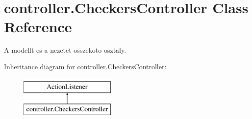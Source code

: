 \hypertarget{classcontroller_1_1_checkers_controller}{}\section{controller.\+Checkers\+Controller Class Reference}
\label{classcontroller_1_1_checkers_controller}


A modellt es a nezetet osszekoto osztaly.  


Inheritance diagram for controller.\+Checkers\+Controller\+:\begin{figure}[H]
\begin{center}
\leavevmode
\includegraphics[height=2.000000cm]{classcontroller_1_1_checkers_controller}
\end{center}
\end{figure}
